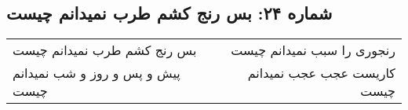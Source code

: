 \begin{center}
\section*{شماره ۲۴: بس رنج کشم طرب نمیدانم چیست}
\label{sec:024}
\begin{longtable}{l p{0.5cm} r}
بس رنج کشم طرب نمیدانم چیست
&&
رنجوری را سبب نمیدانم چیست
\\
پیش و پس و روز و شب نمیدانم چیست
&&
کاریست عجب عجب نمیدانم چیست
\\
\end{longtable}
\end{center}
